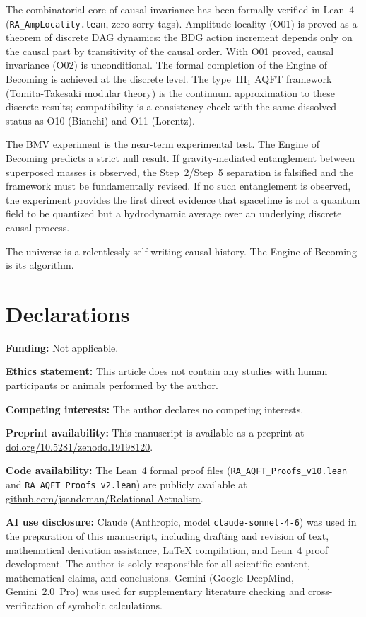 \documentclass[11pt,a4paper]{article}
\theoremstyle{plain}
\theoremstyle{definition}
\theoremstyle{remark}
\begin{document}
The combinatorial core of causal invariance has been formally verified in
Lean~4 (\texttt{RA\_AmpLocality.lean}, zero sorry tags). Amplitude
locality (O01) is proved as a theorem of discrete DAG dynamics: the
BDG action increment depends only on the causal past by transitivity
of the causal order. With O01 proved, causal invariance (O02) is
unconditional. The formal completion of the Engine of Becoming is
achieved at the discrete level. The type~III$_1$ AQFT framework
(Tomita-Takesaki modular theory) is the continuum approximation to
these discrete results; compatibility is a consistency check with the
same dissolved status as O10 (Bianchi) and O11 (Lorentz).

The BMV experiment is the near-term experimental test. The Engine of Becoming
predicts a strict null result. If gravity-mediated entanglement between
superposed masses is observed, the Step~2/Step~5 separation is falsified and
the framework must be fundamentally revised. If no such entanglement is
observed, the experiment provides the first direct evidence that spacetime is
not a quantum field to be quantized but a hydrodynamic average over an
underlying discrete causal process.

The universe is a relentlessly self-writing causal history.
The Engine of Becoming is its algorithm.


\section*{Declarations}
\textbf{Funding:} Not applicable.

\textbf{Ethics statement:} This article does not contain any studies with human participants or animals performed by the author.

\quad
\textbf{Competing interests:} The author declares no competing interests.

\textbf{Preprint availability:} This manuscript is available as a preprint at
\href{https://doi.org/10.5281/zenodo.19198120}{doi.org/10.5281/zenodo.19198120}.

\textbf{Code availability:} The Lean~4 formal proof files
(\texttt{RA\_AQFT\_Proofs\_v10.lean} and \texttt{RA\_AQFT\_Proofs\_v2.lean})
are publicly available at
\href{https://github.com/jsandeman/Relational-Actualism}{github.com/jsandeman/Relational-Actualism}.

\textbf{AI use disclosure:} Claude (Anthropic, model \texttt{claude-sonnet-4-6}) was used in the preparation of this manuscript, including drafting and revision of text, mathematical derivation assistance, \LaTeX{} compilation, and Lean~4 proof development. The author is solely responsible for all scientific content, mathematical claims, and conclusions. Gemini (Google DeepMind, Gemini~2.0~Pro) was used for supplementary literature checking and cross-verification of symbolic calculations.
\end{document}
